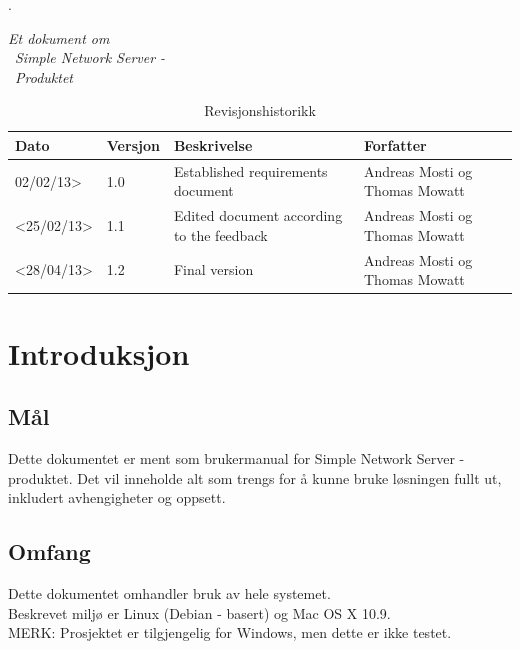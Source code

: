 \documentclass{article}
\begin{document}




\newpage
.\vfill
\begin{centering}
\LARGE


\textit{Et dokument om}  \\ 
\ \textit {Simple Network Server -} \\ 
\ \textit {Produktet}
\vspace{12cm}
\hspace{15cm}
\newpage
\end{centering} 
\pagestyle{fancy}
\setlength\headsep{30pt}


\begin{table}[h] %

\caption{Revisjonshistorikk}
	\begin{tabular}{| m{3cm} | m{1cm} | m{5cm} | m{4cm} |} 
	\hline	
	Dato & Versjon & Beskrivelse & Forfatter\\ 
	\hline
	 02/02/13> & 1.0 & Established requirements document & Andreas Mosti og Thomas Mowatt\\ 
	\hline
	<25/02/13> & 1.1 & Edited document according to the feedback & Andreas Mosti og Thomas Mowatt\\ 
	\hline
	<28/04/13> & 1.2 & Final version & Andreas Mosti og Thomas Mowatt\\ 
	\hline
	
	\end{tabular}
\end{table}

\newpage

\tableofcontents
\newpage
\section{Introduksjon}
\subsection{Mål}
Dette dokumentet er ment som brukermanual for Simple Network Server - produktet. Det vil inneholde alt som trengs for å kunne bruke løsningen fullt ut, inkludert avhengigheter og oppsett.
\subsection{Omfang}
Dette dokumentet omhandler bruk av hele systemet. \\ Beskrevet miljø er Linux (Debian - basert) og Mac OS X 10.9.
\\ MERK: Prosjektet er tilgjengelig for Windows, men dette er ikke testet. 
\end{document}

